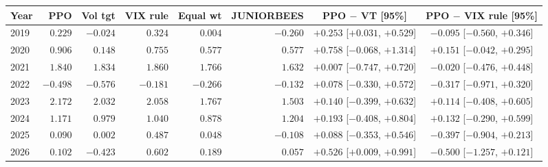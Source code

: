 \begin{tabular}{lrrrrrcc}
\toprule
Year & PPO & Vol tgt & VIX rule & Equal wt & JUNIORBEES & PPO $-$ VT [95\%] & PPO $-$ VIX rule [95\%] \\
\midrule
2019 & $0.229$ & $-0.024$ & $0.324$ & $0.004$ & $-0.260$ & $+0.253$ [$+0.031$, $+0.529$] & $-0.095$ [$-0.560$, $+0.346$] \\
2020 & $0.906$ & $0.148$ & $0.755$ & $0.577$ & $0.577$ & $+0.758$ [$-0.068$, $+1.314$] & $+0.151$ [$-0.042$, $+0.295$] \\
2021 & $1.840$ & $1.834$ & $1.860$ & $1.766$ & $1.632$ & $+0.007$ [$-0.747$, $+0.720$] & $-0.020$ [$-0.476$, $+0.448$] \\
2022 & $-0.498$ & $-0.576$ & $-0.181$ & $-0.266$ & $-0.132$ & $+0.078$ [$-0.330$, $+0.572$] & $-0.317$ [$-0.971$, $+0.320$] \\
2023 & $2.172$ & $2.032$ & $2.058$ & $1.767$ & $1.503$ & $+0.140$ [$-0.399$, $+0.632$] & $+0.114$ [$-0.408$, $+0.605$] \\
2024 & $1.171$ & $0.979$ & $1.040$ & $0.878$ & $1.204$ & $+0.193$ [$-0.408$, $+0.804$] & $+0.132$ [$-0.290$, $+0.599$] \\
2025 & $0.090$ & $0.002$ & $0.487$ & $0.048$ & $-0.108$ & $+0.088$ [$-0.353$, $+0.546$] & $-0.397$ [$-0.904$, $+0.213$] \\
2026 & $0.102$ & $-0.423$ & $0.602$ & $0.189$ & $0.057$ & $+0.526$ [$+0.009$, $+0.991$] & $-0.500$ [$-1.257$, $+0.121$] \\
\bottomrule
\end{tabular}
